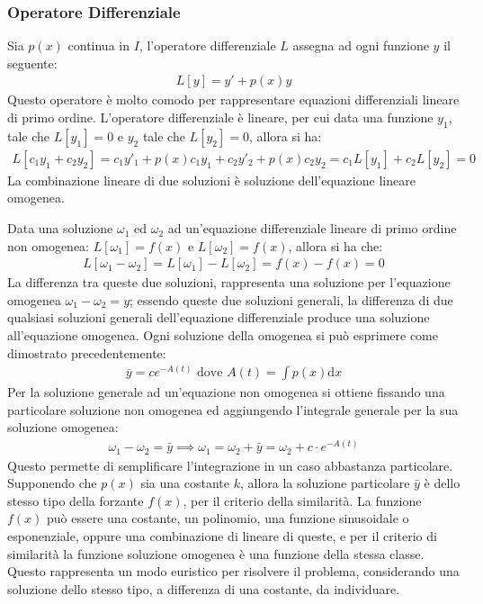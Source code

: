 \documentclass{article}
\newcommand{\df}{\mathrm{d}}
\numberwithin{equation}{subsection}
\begin{document}
\subsubsection{Operatore Differenziale}

Sia $p(x)$ continua in $I$, l'operatore differenziale $L$ assegna ad ogni funzione $y$ il seguente:
\begin{gather}
    L[y]=y'+p(x)y
\end{gather}
Questo operatore è molto comodo per rappresentare equazioni differenziali lineare di primo ordine. 
L'operatore differenziale è lineare, per cui data una funzione $y_1$, tale che $L[y_1]=0$ e $y_2$ tale che $L[y_2]=0$, allora si ha:
\begin{gather*}
    L[c_1y_1+c_2y_2]=c_1y'_1+p(x)c_1y_1+c_2y'_2+p(x)c_2y_2=c_1L[y_1]+c_2L[y_2]=0
\end{gather*}
La combinazione lineare di due soluzioni è soluzione dell'equazione lineare omogenea. 

Data una soluzione $\omega_1$ ed $\omega_2$ ad un'equazione differenziale lineare di primo ordine non omogenea: $L[\omega_1]=f(x)$ e $L[\omega_2]=f(x)$, allora si ha che:
\begin{gather*}
    L[\omega_1-\omega_2]=L[\omega_1]-L[\omega_2]=f(x)-f(x)=0
\end{gather*}
La differenza tra queste due soluzioni, rappresenta una soluzione per l'equazione omogenea $\omega_1-\omega_2=y$; essendo queste due soluzioni generali, la differenza di due qualsiasi soluzioni generali dell'equazione differenziale produce una soluzione all'equazione omogenea. Ogni soluzione della omogenea si può esprimere come dimostrato precedentemente:
\begin{gather*}
    \bar{y}=ce^{-A(t)}\mbox{ dove } A(t)=\displaystyle\int p(x)\df x
\end{gather*}
Per la soluzione generale ad un'equazione non omogenea si ottiene fissando una particolare soluzione non omogenea ed aggiungendo l'integrale generale per la sua soluzione omogenea:
\begin{gather}
    \omega_1-\omega_2=\bar{y}\implies\omega_1=\omega_2+\bar{y}=\omega_2+c\cdot e^{-A(t)}
\end{gather}
Questo permette di semplificare l'integrazione in un caso abbastanza particolare. 
Supponendo che $p(x)$ sia una costante $k$, allora la soluzione particolare $\bar{y}$ è dello stesso tipo della forzante $f(x)$, per il criterio della similarità. 
La funzione $f(x)$ può essere una costante, un polinomio, una funzione sinusoidale o esponenziale, oppure una combinazione di lineare di queste, e per il criterio di similarità la funzione soluzione omogenea è una funzione della stessa classe. Questo rappresenta un modo euristico per risolvere il problema, considerando una soluzione dello stesso tipo, a differenza di una costante, da individuare. 
\end{document}
